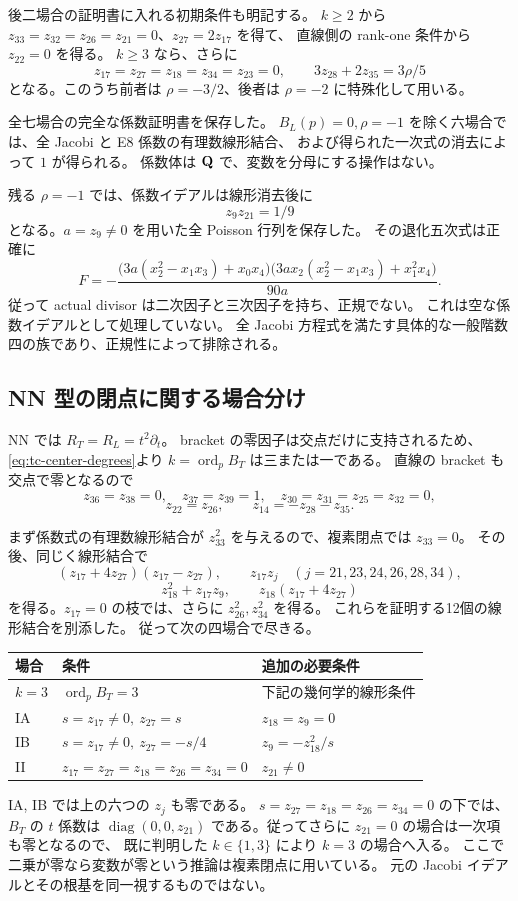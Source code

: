 \documentclass[11pt,a4paper]{ltjsarticle}
\DeclareMathOperator{\diag}{diag}
\theoremstyle{remark}\newtheorem{remark}[theorem]{注意}
\begin{document}
後二場合の証明書に入れる初期条件も明記する。
$k\ge2$ から $z_{33}=z_{32}=z_{26}=z_{21}=0$、$z_{27}=2z_{17}$ を得て、
直線側の rank-one 条件から $z_{22}=0$ を得る。
$k\ge3$ なら、さらに
\[
 z_{17}=z_{27}=z_{18}=z_{34}=z_{23}=0,\qquad
 3z_{28}+2z_{35}=3\rho/5
\]
となる。このうち前者は $\rho=-3/2$、後者は $\rho=-2$ に特殊化して用いる。

全七場合の完全な係数証明書を保存した。
$B_L(p)=0,\rho=-1$ を除く六場合では、全 Jacobi と E8 係数の有理数線形結合、
および得られた一次式の消去によって $1$ が得られる。
係数体は $\mathbf Q$ で、変数を分母にする操作はない。

残る $\rho=-1$ では、係数イデアルは線形消去後に
\[
 z_9z_{21}=1/9
\]
となる。$a=z_9\ne0$ を用いた全 Poisson 行列を保存した。
その退化五次式は正確に
\begin{equation}\label{eq:ss-factor-family}
 F=-\frac{\bigl(3a(x_2^2-x_1x_3)+x_0x_4\bigr)
 \bigl(3a x_2(x_2^2-x_1x_3)+x_1^2x_4\bigr)}{90a}.
\end{equation}
従って actual divisor は二次因子と三次因子を持ち、正規でない。
これは空な係数イデアルとして処理していない。
全 Jacobi 方程式を満たす具体的な一般階数四の族であり、正規性によって排除される。

\subsection{NN 型の閉点に関する場合分け}
NN では $R_T=R_L=t^2\partial_t$。
bracket の零因子は交点だけに支持されるため、\eqref{eq:tc-center-degrees}より
$k=\operatorname{ord}_p B_T$ は三または一である。
直線の bracket も交点で零となるので
\[
 z_{36}=z_{38}=0,\quad z_{37}=z_{39}=1,\quad
 z_{30}=z_{31}=z_{25}=z_{32}=0,
\]
\[
 z_{22}=z_{26},\qquad z_{14}=-z_{28}-z_{35}.
\]

まず係数式の有理数線形結合が $z_{33}^2$ を与えるので、複素閉点では $z_{33}=0$。
その後、同じく線形結合で
\[
 (z_{17}+4z_{27})(z_{17}-z_{27}),\qquad
 z_{17}z_j\quad(j=21,23,24,26,28,34),
\]
\[
 z_{18}^2+z_{17}z_9,\qquad z_{18}(z_{17}+4z_{27})
\]
を得る。$z_{17}=0$ の枝では、さらに $z_{26}^2,z_{34}^2$ を得る。
これらを証明する12個の線形結合を別添した。
従って次の四場合で尽きる。

\begin{center}\small
\begin{tabular}{@{}lll@{}}\toprule
場合 & 条件 & 追加の必要条件\\\midrule
$k=3$ & $\operatorname{ord}_pB_T=3$ & 下記の幾何学的線形条件\\
IA & $s=z_{17}\ne0,\ z_{27}=s$ & $z_{18}=z_9=0$\\
IB & $s=z_{17}\ne0,\ z_{27}=-s/4$ & $z_9=-z_{18}^2/s$\\
II & $z_{17}=z_{27}=z_{18}=z_{26}=z_{34}=0$ & $z_{21}\ne0$\\\bottomrule
\end{tabular}\end{center}
IA, IB では上の六つの $z_j$ も零である。
$s=z_{27}=z_{18}=z_{26}=z_{34}=0$ の下では、$B_T$ の $t$ 係数は
$\diag(0,0,z_{21})$ である。従ってさらに $z_{21}=0$ の場合は一次項も零となるので、
既に判明した $k\in\{1,3\}$ により $k=3$ の場合へ入る。
ここで二乗が零なら変数が零という推論は複素閉点に用いている。
元の Jacobi イデアルとその根基を同一視するものではない。
\end{document}
